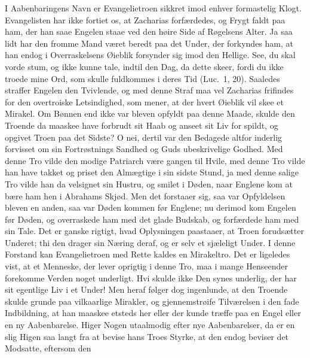 \documentclass[12pt,a4paper]{book}
\begin{document}
I Aabenbaringens Navn er Evangelietroen sikkret imod enhver formastelig
Klogt. Evangelisten har ikke fortiet os, at Zacharias forfærdedes, og
Frygt faldt paa ham, der han saae Engelen staae ved den høire Side af
Røgelsens Alter. Ja saa lidt har den fromme Mand været beredt paa det
Under, der forkyndes ham, at han endog i Overraskelsens Øieblik forsynder
sig imod den Hellige.
{\large See, du skal vorde stum, og ikke kunne tale, indtil den Dag, da
dette skeer, fordi du ikke troede mine Ord, som skulle fuldkommes i deres
Tid (Luc.\ 1, 20).} Saaledes straffer Engelen den Tvivlende, og med denne
Straf maa vel Zacharias frifindes for den overtroiske Letsindighed, som
mener, at der hvert Øieblik vil skee et Mirakel. Om Bønnen end ikke var
bleven opfyldt paa denne Maade, skulde den Troende da maaskee have
forbrudt sit Haab og anseet sit Liv for spildt, og opgivet Troen paa det
Sidste? O nei, dertil var den Bedagede altfor inderlig forvisset om sin
Fortrøstnings Sandhed og Guds ubeskrivelige Godhed. Med denne Tro vilde
den modige Patriarch være gangen til Hvile, med denne Tro vilde han have
takket og priset den Almægtige i sin sidste Stund, ja med denne salige
Tro vilde han da velsignet sin Hustru, og smilet i Døden, naar Englene
kom at bære ham hen i Abrahams Skjød. Men det forstaaer sig, saa var
Opfyldelsen bleven en anden, saa var Døden kommen før Englene; nu derimod
kom Engelen før Døden, og overraskede ham med det glade
Budskab, og forfærdede ham med sin Tale. Det er ganske rigtigt, hvad
Oplysningen paastaaer, at Troen forudsætter Underet; thi den drager sin
Næring deraf, og er selv et sjæleligt Under. I denne Forstand kan
Evangelietroen med Rette kaldes en Mirakeltro. Det er ligeledes vist, at
et Menneske, der lever oprigtig i denne Tro, maa i mange Henseender
forekomme Verden noget underligt. Hvi skulde ikke Den synes underlig, der
har sit egentlige Liv i et Under! Men heraf følger dog ingenlunde, at den
Troende skulde grunde paa vilkaarlige Mirakler, og gjennemstrøife
Tilværelsen i den fade Indbildning, at han maaskee etsteds her eller der
kunde træffe paa en Engel eller en ny Aabenbarelse. Higer Nogen
utaalmodig efter nye Aabenbarelser, da er en slig Higen saa langt fra at
bevise hans Troes Styrke, at den endog beviser det Modsatte, eftersom den
\end{document}
